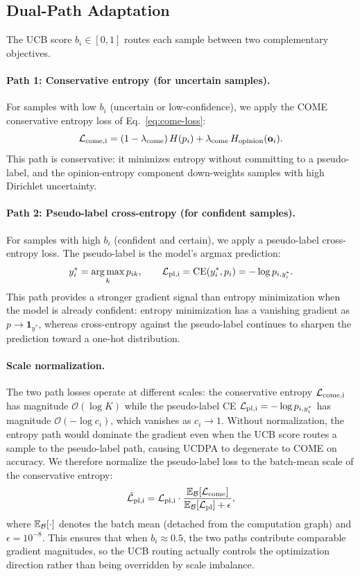 \subsection{Dual-Path Adaptation}
\label{sec:method:dual}

The UCB score $b_i \in [0,1]$ routes each sample between two complementary objectives.

\paragraph{Path 1: Conservative entropy (for uncertain samples).}
For samples with low $b_i$ (uncertain or low-confidence), we apply the COME conservative entropy loss of Eq.~\eqref{eq:come-loss}:
\[
  \mathcal{L}_\mathrm{come,i} = (1-\lambda_\mathrm{come})\, H(p_i) + \lambda_\mathrm{come}\, H_\mathrm{opinion}(\mathbf{o}_i).
\]
This path is conservative: it minimizes entropy without committing to a pseudo-label, and the opinion-entropy component down-weights samples with high Dirichlet uncertainty.

\paragraph{Path 2: Pseudo-label cross-entropy (for confident samples).}
For samples with high $b_i$ (confident and certain), we apply a pseudo-label cross-entropy loss. The pseudo-label is the model's argmax prediction:
\[
  y_i^* = \operatorname*{arg\,max}_k p_{ik}, \qquad \mathcal{L}_\mathrm{pl,i} = \mathrm{CE}(y_i^*, p_i) = -\log p_{i,y_i^*}.
\]
This path provides a stronger gradient signal than entropy minimization when the model is already confident: entropy minimization has a vanishing gradient as $p \to \mathbf{1}_{y^*}$, whereas cross-entropy against the pseudo-label continues to sharpen the prediction toward a one-hot distribution.

\paragraph{Scale normalization.}
The two path losses operate at different scales: the conservative entropy $\mathcal{L}_\mathrm{come,i}$ has magnitude $\mathcal{O}(\log K)$ while the pseudo-label CE $\mathcal{L}_\mathrm{pl,i} = -\log p_{i,y_i^*}$ has magnitude $\mathcal{O}(-\log c_i)$, which vanishes as $c_i \to 1$. Without normalization, the entropy path would dominate the gradient even when the UCB score routes a sample to the pseudo-label path, causing UCDPA to degenerate to COME on accuracy. We therefore normalize the pseudo-label loss to the batch-mean scale of the conservative entropy:
\[
  \tilde{\mathcal{L}}_\mathrm{pl,i} = \mathcal{L}_\mathrm{pl,i} \cdot \frac{\mathbb{E}_\mathcal{B}[\mathcal{L}_\mathrm{come}]}{\mathbb{E}_\mathcal{B}[\mathcal{L}_\mathrm{pl}] + \epsilon},
\]
where $\mathbb{E}_\mathcal{B}[\cdot]$ denotes the batch mean (detached from the computation graph) and $\epsilon = 10^{-8}$. This ensures that when $b_i \approx 0.5$, the two paths contribute comparable gradient magnitudes, so the UCB routing actually controls the optimization direction rather than being overridden by scale imbalance.

